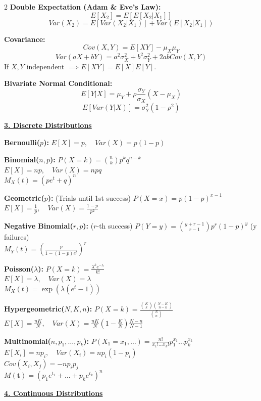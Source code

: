 \documentclass{article}
\newcommand{\sectiontitle}[1]{\vspace{0.2cm}\textbf{\large \underline{#1}}\vspace{0.1cm}}
\newcommand{\distname}[1]{\textbf{#1}}
\begin{document}
\begin{multicols*}{2}
\distname{Double Expectation (Adam \& Eve's Law):}
\[ E[X_2] = E[E[X_2|X_1]] \]
\[ Var(X_2) = E[Var(X_2|X_1)] + Var(E[X_2|X_1]) \]

\distname{Covariance:}
\[ Cov(X,Y) = E[XY] - \mu_X \mu_Y \]
\[ Var(aX + bY) = a^2\sigma_X^2 + b^2\sigma_Y^2 + 2ab Cov(X,Y) \]
If $X, Y$ independent $\implies E[XY] = E[X]E[Y]$.

\distname{Bivariate Normal Conditional:}
\[ E[Y|X] = \mu_Y + \rho \frac{\sigma_Y}{\sigma_X}(X - \mu_X) \]
\[ E[Var(Y|X)] = \sigma_Y^2(1-\rho^2) \]

\sectiontitle{3. Discrete Distributions}

\distname{Bernoulli($p$):}
$E[X] = p, \quad Var(X) = p(1-p)$

\distname{Binomial($n, p$):}
$P(X=k) = \binom{n}{k} p^k q^{n-k}$
\\ $E[X] = np, \quad Var(X) = npq$
\\ $M_X(t) = (pe^t + q)^n$

\distname{Geometric($p$):} (Trials until 1st success)
$P(X=x) = p(1-p)^{x-1}$
\\ $E[X] = \frac{1}{p}, \quad Var(X) = \frac{1-p}{p^2}$

\distname{Negative Binomial($r, p$):} ($r$-th success)
$P(Y=y) = \binom{y+r-1}{r-1} p^r (1-p)^y$ (y failures)
\\ $M_Y(t) = \left( \frac{p}{1-(1-p)e^t} \right)^r$

\distname{Poisson($\lambda$):}
$P(X=k) = \frac{\lambda^k e^{-\lambda}}{k!}$
\\ $E[X] = \lambda, \quad Var(X) = \lambda$
\\ $M_X(t) = \exp(\lambda(e^t - 1))$

\distname{Hypergeometric($N, K, n$):}
$P(X=k) = \frac{\binom{K}{k}\binom{N-K}{n-k}}{\binom{N}{n}}$
\\ $E[X] = \frac{nK}{N}, \quad Var(X) = \frac{nK}{N}(1-\frac{K}{N})\frac{N-n}{N-1}$

\distname{Multinomial($n, p_1, \dots, p_k$):}
$P(X_1=x_1, \dots) = \frac{n!}{x_1! \dots x_k!} p_1^{x_1} \dots p_k^{x_k}$
\\ $E[X_i] = np_i, \quad Var(X_i) = np_i(1-p_i)$
\\ $Cov(X_i, X_j) = -np_i p_j$
\\ $M(\mathbf{t}) = (p_1 e^{t_1} + \dots + p_k e^{t_k})^n$

\sectiontitle{4. Continuous Distributions}


\end{multicols*}
\end{document}
